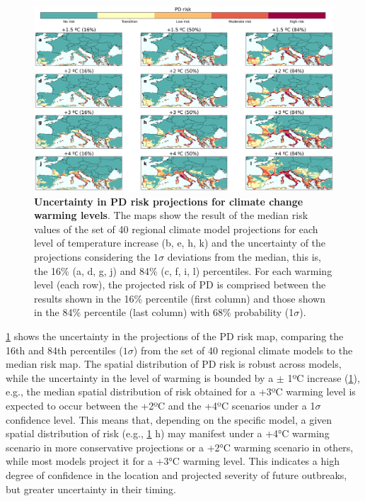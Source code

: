 \begin{figure}[t!]
    \centering
    \includegraphics[width=\textwidth]{Figures/Uncertainty.png}
    \caption[Uncertainty in PD risk projections for climate change
        warming levels]{\textbf{Uncertainty in PD risk projections for climate
            change
            warming levels}. The maps show the result of the median risk values
        of the set
        of 40 regional climate model projections for each level of temperature
        increase
        (b, e, h, k) and the uncertainty of the projections considering the $1
            \sigma$
        deviations from the median, this is, the 16\% (a, d, g, j) and 84\% (c,
        f, i,
        l) percentiles. For each warming level (each row), the projected risk
        of PD is
        comprised between the results shown in the 16\% percentile (first
        column) and
        those shown in the 84\% percentile (last column) with 68\% probability
        (1$\sigma$).}
    \label{fig:uncertainty}
\end{figure}

\cref{fig:uncertainty} shows the uncertainty in the projections of the PD
risk map, comparing the 16th and 84th percentiles ($1\sigma$) from the set of
40 regional climate models to the median risk map. The spatial distribution of
PD risk is robust across models, while the uncertainty in the level of warming
is bounded by a $\pm$ 1ºC increase (\cref{fig:uncertainty}), e.g., the median
spatial distribution of risk obtained for a +3ºC warming level is expected to
occur between the +2ºC and the +4ºC scenarios under a 1$\sigma$ confidence
level. This means that, depending on the specific model, a given spatial
distribution of risk (e.g., \cref{fig:uncertainty} h) may manifest under a +4°C
warming scenario in more conservative projections or a +2°C warming scenario in
others, while most models project it for a +3°C warming level. This indicates a
high degree of confidence in the location and projected severity of future
outbreaks, but greater uncertainty in their timing.

